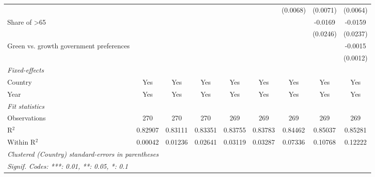 \begin{table}[htbp]
\begin{tabular}{lcccccccc}
                                                    &          &          &          &          &          & (0.0068)     & (0.0071)     & (0.0064)\\   
      Share of >65                                  &          &          &          &          &          &              & -0.0169      & -0.0159\\   
                                                    &          &          &          &          &          &              & (0.0246)     & (0.0237)\\   
      Green vs. growth government preferences       &          &          &          &          &          &              &              & -0.0015\\   
                                                    &          &          &          &          &          &              &              & (0.0012)\\   
      \midrule
      \emph{Fixed-effects}\\
      Country                                       & Yes      & Yes      & Yes      & Yes      & Yes      & Yes          & Yes          & Yes\\  
      Year                                          & Yes      & Yes      & Yes      & Yes      & Yes      & Yes          & Yes          & Yes\\  
      \midrule
      \emph{Fit statistics}\\
      Observations                                  & 270      & 270      & 270      & 269      & 269      & 269          & 269          & 269\\  
      R$^2$                                         & 0.82907  & 0.83111  & 0.83351  & 0.83755  & 0.83783  & 0.84462      & 0.85037      & 0.85281\\  
      Within R$^2$                                  & 0.00042  & 0.01236  & 0.02641  & 0.03119  & 0.03287  & 0.07336      & 0.10768      & 0.12222\\  
      \midrule \midrule
      \multicolumn{9}{l}{\emph{Clustered (Country) standard-errors in parentheses}}\\
      \multicolumn{9}{l}{\emph{Signif. Codes: ***: 0.01, **: 0.05, *: 0.1}}\\
   \end{tabular}
\end{table}


